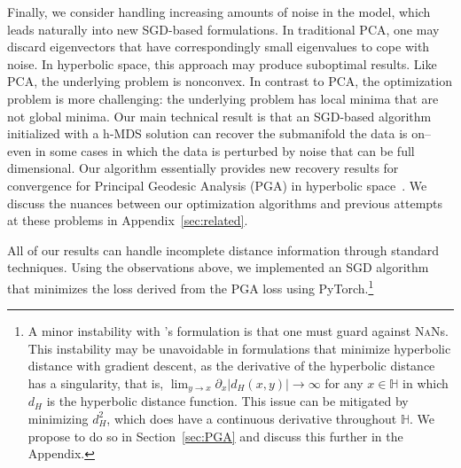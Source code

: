Finally, we consider handling increasing amounts of noise in the
model, which leads naturally into new SGD-based formulations. In
traditional PCA, one may discard eigenvectors that have
correspondingly small eigenvalues to cope with noise. In hyperbolic
space, this approach may produce suboptimal results. Like PCA, the
underlying problem is nonconvex. In contrast to PCA, the optimization
problem is more challenging: the underlying problem has local minima
that are not global minima. Our main technical result is that an
SGD-based algorithm initialized with a h-MDS solution can recover the
submanifold the data is on--even in some cases in which the data is
perturbed by noise that can be full dimensional. Our algorithm
essentially provides new recovery results for convergence for
Principal Geodesic Analysis (PGA) in hyperbolic space~\cite{PGA, GPCA}.
We discuss the nuances between our optimization algorithms and previous attempts 
at these problems in Appendix~\ref{sec:related}.

All of our results can handle incomplete distance information through standard
techniques. Using the observations above, we
implemented an SGD algorithm that minimizes
the loss derived from the PGA loss using PyTorch.\footnote{A minor
  instability with \citet{fb,ucl}'s formulation is that one must guard
  against \textsc{NaN}s. This instability may be unavoidable in
  formulations that minimize hyperbolic distance with gradient
  descent, as the derivative of the hyperbolic distance has a
  singularity, that is, $\lim_{y \to x} \partial_x |d_H(x, y)| \to
  \infty$ for any $x \in \mathbb{H}$ in which $d_H$ is the hyperbolic
  distance function. This issue can be mitigated by minimizing
  $d_H^2$, which does have a continuous derivative throughout
  $\mathbb{H}$. We propose to do so in Section~\ref{sec:PGA} and
discuss this further in the Appendix.}



